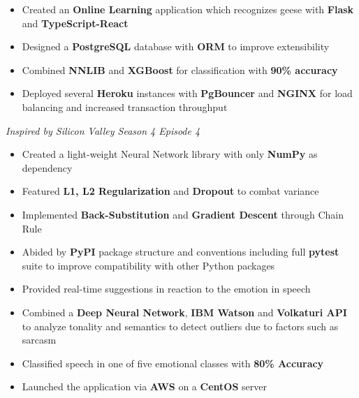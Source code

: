 \documentclass[10pt,a4paper,ragged2e]{altacv}
\begin{document}
\divider

\begin{itemize}
    \item Created an \textbf{Online Learning} application which recognizes geese with \textbf{Flask} and \textbf{TypeScript-React}
    \item Designed a \textbf{PostgreSQL} database with \textbf{ORM} to improve extensibility
    \item Combined \textbf{NNLIB} and \textbf{XGBoost} for classification with \textbf{90\% accuracy}
    \item Deployed several \textbf{Heroku} instances with \textbf{PgBouncer} and \textbf{NGINX} for load balancing and increased transaction throughput
\end{itemize}
\textit{Inspired by Silicon Valley Season 4 Episode 4}

\divider

\begin{itemize}
    \item Created a light-weight Neural Network library with only \textbf{NumPy} as dependency
    \item Featured \textbf{L1, L2 Regularization} and \textbf{Dropout} to combat variance
    \item Implemented \textbf{Back-Substitution} and \textbf{Gradient Descent} through Chain Rule
    \item Abided by \textbf{PyPI} package structure and conventions including full \textbf{pytest} suite to improve compatibility with other Python packages
\end{itemize}

\divider

\begin{itemize}
    \item Provided real-time suggestions in reaction to the emotion in speech
    \item Combined a \textbf{Deep Neural Network}, \textbf{IBM Watson} and \textbf{Volkaturi API} to analyze tonality and semantics to detect outliers due to factors such as sarcasm
    \item Classified speech in one of five emotional classes with \textbf{80\% Accuracy}
    \item Launched the application via \textbf{AWS} on a \textbf{CentOS} server
\end{itemize}
\end{document}
